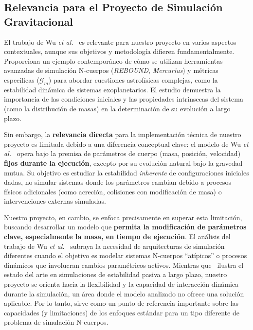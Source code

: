 \subsection{Relevancia para el Proyecto de Simulación Gravitacional}
El trabajo de Wu \textit{et al.}~\cite{Wu2025} es relevante para nuestro proyecto en varios aspectos contextuales, aunque sus objetivos y metodología difieren fundamentalmente. Proporciona un ejemplo contemporáneo de cómo se utilizan herramientas avanzadas de simulación N-cuerpos (\textit{REBOUND}, \textit{Mercurius}) y métricas específicas ($\mathcal{G}_m$) para abordar cuestiones astrofísicas complejas, como la estabilidad dinámica de sistemas exoplanetarios. El estudio demuestra la importancia de las condiciones iniciales y las propiedades intrínsecas del sistema (como la distribución de masas) en la determinación de su evolución a largo plazo.

Sin embargo, la \textbf{relevancia directa} para la implementación técnica de nuestro proyecto es limitada debido a una diferencia conceptual clave: el modelo de Wu \textit{et al.}~\cite{Wu2025} opera bajo la premisa de parámetros de cuerpo (masa, posición, velocidad) \textbf{fijos durante la ejecución}, excepto por su evolución natural bajo la gravedad mutua. Su objetivo es estudiar la estabilidad \textit{inherente} de configuraciones iniciales dadas, no simular sistemas donde los parámetros cambian debido a procesos físicos adicionales (como acreción, colisiones con modificación de masa) o intervenciones externas simuladas.

Nuestro proyecto, en cambio, se enfoca precisamente en superar esta limitación, buscando desarrollar un modelo que \textbf{permita la modificación de parámetros clave, especialmente la masa, en tiempo de ejecución}. El análisis del trabajo de Wu \textit{et al.}~\cite{Wu2025} subraya la necesidad de arquitecturas de simulación diferentes cuando el objetivo es modelar sistemas N-cuerpos ``atípicos'' o procesos dinámicos que involucran cambios paramétricos activos. Mientras que~\cite{Wu2025} ilustra el estado del arte en simulaciones de estabilidad pasiva a largo plazo, nuestro proyecto se orienta hacia la flexibilidad y la capacidad de interacción dinámica durante la simulación, un área donde el modelo analizado no ofrece una solución aplicable. Por lo tanto, sirve como un punto de referencia importante sobre las capacidades (y limitaciones) de los enfoques estándar para un tipo diferente de problema de simulación N-cuerpos.